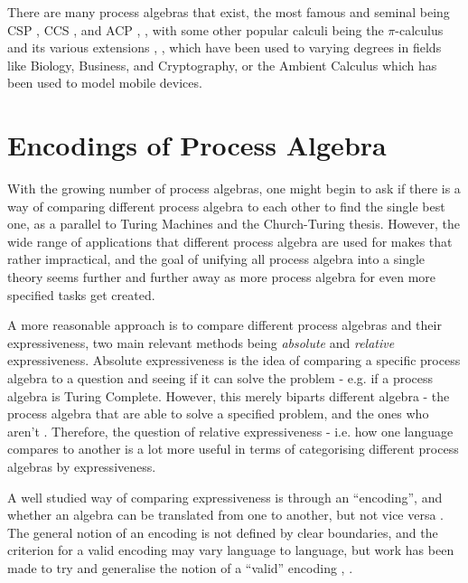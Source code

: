 \documentclass[logo,bsc,singlespacing,parskip,online]{infthesis}
\begin{document}
\begin{preliminary}
There are many process algebras that exist, the most famous and seminal being CSP \citep{brookes_theory_1984}, CCS \citep{milner_calculus_1980}, and ACP \citep{bergstra_process_1984}, \citep{bergstra_acp_1989}, with some other popular calculi being the $\pi$-calculus and its various extensions  \citep{engberg_calculus_1986}, \citep{parrow_fusion_1998}, \citep{abadi_calculus_1999} which have been used to varying degrees in fields like Biology, Business, and Cryptography, or the Ambient Calculus \citep{cardelli_mobile_1998} which has been used to model mobile devices.

\section{Encodings of Process Algebra}

With the growing number of process algebras, one might begin to ask if there is a way of comparing different process algebra to each other to find the single best one, as a parallel to Turing Machines and the Church-Turing thesis. However, the wide range of applications that different process algebra are used for makes that rather impractical, and the goal of unifying all process algebra into a single theory seems further and further away as more process algebra for even more specified tasks get created.

A more reasonable approach is to compare different process algebras and their expressiveness, two main relevant methods being \textit{absolute} and \textit{relative} expressiveness.\citep{parrow_expressiveness_2008} Absolute expressiveness is the idea of comparing a specific process algebra to a question and seeing if it can solve the problem - e.g. if a process algebra is Turing Complete. However, this merely biparts different algebra - the process algebra that are able to solve a specified problem, and the ones who aren't \citep{gorla_towards_2010}. Therefore, the question of relative expressiveness - i.e. how one language compares to another is a lot more useful in terms of categorising different process algebras by expressiveness.

A well studied way of comparing expressiveness is through an ``encoding'', and whether an algebra can be translated from one to another, but not vice versa \citep{peters_comparing_2019}. The general notion of an encoding is not defined by clear boundaries, and the criterion for a valid encoding may vary language to language, but work has been made to try and generalise the notion of a ``valid'' encoding \citep{gorla_towards_2010}, \citep{glabbeek_theory_2018}.


\end{preliminary}
\end{document}
